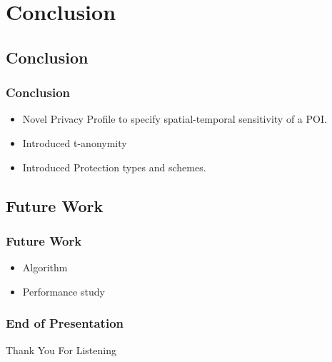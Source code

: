 \section{Conclusion}
\subsection{Conclusion} %
\begin{frame}[red] %
\frametitle{Conclusion}

\begin{itemize}
	\item Novel Privacy Profile to specify spatial-temporal sensitivity of a POI.
	\item Introduced t-anonymity
	\item Introduced Protection types and schemes.

\end{itemize}

 
\end{frame}

\subsection{Future Work} %
\begin{frame}[red] %
\frametitle{Future Work}

\begin{itemize}
	\item Algorithm
	\item Performance study

\end{itemize}
\end{frame}


\begin{frame}[red] %
\frametitle{End of Presentation}

\vspace{20mm}
\begin{center}
    \Huge Thank You For Listening
\end{center}

\end{frame}
